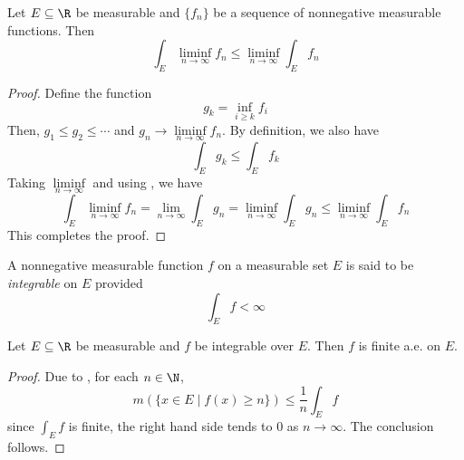 \begin{lemma}
    Let $E\subseteq\R$ be measurable and $\{f_n\}$ be a sequence of nonnegative measurable functions. Then 
    \begin{equation*}
        \int_E\liminf_{n\to\infty}f_n\le\liminf_{n\to\infty}\int_E f_n
    \end{equation*}
\end{lemma}
\begin{proof}
    Define the function 
    \begin{equation*}
        g_k = \inf_{i\ge k}f_i
    \end{equation*}
    Then, $g_1\le g_2\le\cdots$ and $g_n\to\liminf\limits_{n\to\infty} f_n$. By definition, we also have 
    \begin{equation*}
        \int_E g_k\le\int_E f_k
    \end{equation*}
    Taking $\liminf\limits_{n\to\infty}$ and using , we have 
    \begin{equation*}
        \int_E\liminf_{n\to\infty} f_n = \lim_{n\to\infty}\int_E g_n = \liminf_{n\to\infty}\int_E g_n\le\liminf_{n\to\infty}\int_E f_n
    \end{equation*}
    This completes the proof.
\end{proof}

\begin{definition}[Integrable]
    A nonnegative measurable function $f$ on a measurable set $E$ is said to be \textit{integrable} on $E$ provided 
    \begin{equation*}
        \int_E f < \infty
    \end{equation*}
\end{definition}

\begin{proposition}
    Let $E\subseteq\R$ be measurable and $f$ be integrable over $E$. Then $f$ is finite a.e. on $E$.
\end{proposition}
\begin{proof}
    Due to , for each $n\in\N$, 
    \begin{equation*}
        m(\{x\in E\mid f(x)\ge n\})\le\frac{1}{n}\int_E f
    \end{equation*}
    since $\int_E f$ is finite, the right hand side tends to $0$ as $n\to\infty$. The conclusion follows.
\end{proof}

